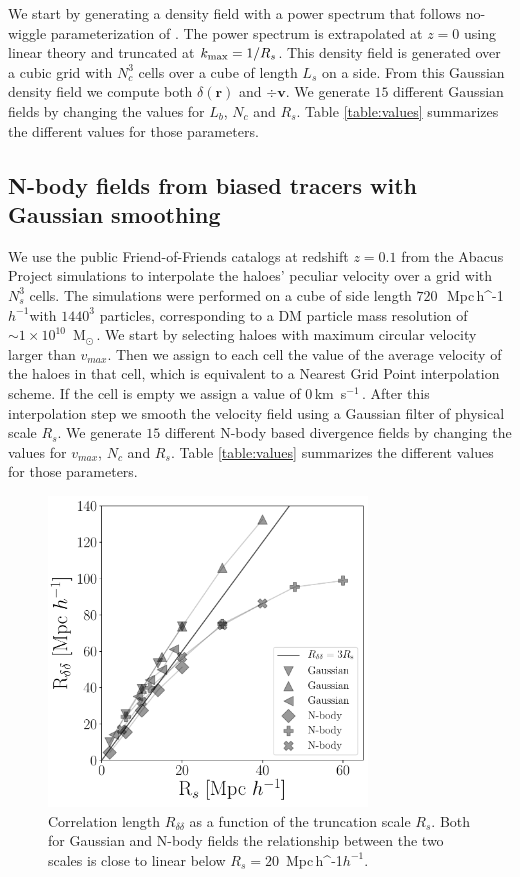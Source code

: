 \documentclass[usenatbib]{mnras}
\newcommand{\Msun}{\,{\rm M}$_{\odot}$\,}
\newcommand{\Mpch}{\,{\rm Mpc}\,\ifmmode h^{-1}\else $h^{-1}$\fi}
\newcommand{\kms}{\,{\rm km}\ s$^{-1}$\,}
\begin{document}
We start by generating a density field with a power spectrum that follows no-wiggle parameterization of \cite{1998ApJ...496..605E}.
The power spectrum is extrapolated at $z=0$ using linear theory and truncated at $k_{\rm max}=1/R_s$.
This density field is generated over a cubic grid with $N_c^3$ cells over a cube of length $L_s$ on a side.
From this Gaussian density field we compute both $\delta(\textbf{r})$ and $\div \textbf{v}$.
We generate $15$ different Gaussian fields by changing the values for $L_b$, $N_c$ and $R_s$. 
Table \ref{table:values} summarizes the different values for those parameters.

\subsection{N-body fields from biased tracers with Gaussian smoothing}

We use the public Friend-of-Friends catalogs at redshift $z=0.1$
from the Abacus Project simulations to interpolate the haloes' peculiar velocity over a grid with $N_s^3$ cells.
The simulations were performed on a cube of side length $720$\ \Mpch with
$1440^3$ particles, corresponding to a DM particle mass resolution of $\sim 1 \times 10^{10}$ \Msun.
We start by selecting haloes with maximum circular velocity larger
than $v_{max}$.
Then we assign to each cell the value of the average velocity of the haloes in that cell, which is equivalent to a Nearest Grid Point interpolation scheme. 
If the cell is empty we assign a value of $0$\kms.
After this interpolation step we smooth the velocity field using a Gaussian filter of physical scale $R_s$.
We generate $15$ different N-body based divergence fields by changing the values for $v_{max}$, $N_c$ and $R_s$. 
Table \ref{table:values} summarizes the different values for those parameters.



\begin{figure}
    \centering
    \includegraphics[width=240pt]{correlation_length.pdf}
    \caption{Correlation length $R_{\delta\delta}$ as a function of the truncation scale $R_s$.
    Both for Gaussian and N-body fields the relationship between the two scales is close to linear below $R_{s}=20$ \Mpch.}
    \label{fig:correlation length}
\end{figure}
\end{document}
